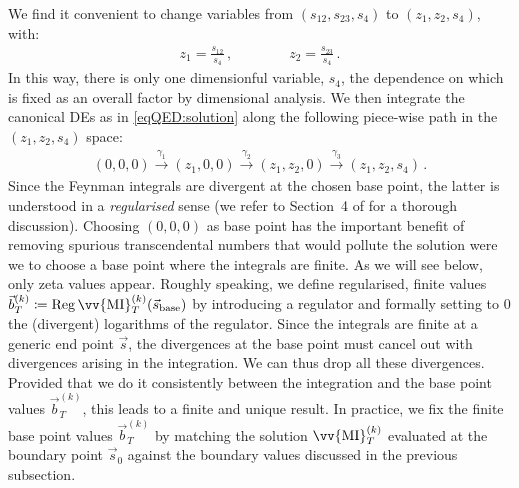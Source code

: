 \documentclass[main.tex]{subfiles}
\begin{document}
We find it convenient to change variables from $(s_{12},s_{23},s_4)$ to $(z_1,z_2,s_4)$, with:
\begin{align}
z_1 = \frac{s_{12}}{s_4} \,, \qquad \qquad z_2 = \frac{s_{23}}{s_4} \,.
\end{align}
In this way, there is only one dimensionful variable, $s_4$, the dependence on which is fixed as an overall factor by dimensional analysis.
We then integrate the canonical DEs as in \cref{eqQED:solution} along the following piece-wise path in the $(z_1,z_2,s_4)$ space:
\begin{align} \label{eqQED:path}
(0,0,0) \overset{\gamma_1}{\longrightarrow} (z_1, 0, 0)  \overset{\gamma_2}{\longrightarrow} (z_1, z_2, 0)  \overset{\gamma_3}{\longrightarrow} (z_1, z_2, s_4) \,.
\end{align}
Since the Feynman integrals are divergent at the chosen base point, the latter is understood in a \emph{regularised} sense (we refer to Section~4 of  for a thorough discussion).
Choosing $(0,0,0)$ as base point has the important benefit of removing spurious transcendental numbers that would pollute the solution were we to choose a base point where the integrals are finite. As we will see below, only zeta values appear.
Roughly speaking, we define regularised, finite values $\vec{b}^{(k)}_{T} \coloneqq \mathrm{Reg} \, \vv{\text{MI}}_T^{(k)}(\vec{s}_{\mathrm{base}})$ by introducing a regulator and formally setting to $0$ the (divergent) logarithms of the regulator.
Since the integrals are finite at a generic end point $\vec{s}$, the divergences at the base point must cancel out with divergences arising in the integration. We can thus drop all these divergences. Provided that we do it consistently between the integration and the base point values $\vec{b}^{(k)}_{T}$, this leads to a finite and unique result. In practice, we fix the finite base point values $\vec{b}^{(k)}_{T}$ by matching the solution $\vv{\text{MI}}_T^{(k)}$ evaluated at the boundary point $\vec{s}_0$ against the boundary values discussed in the previous subsection. 
\end{document}
